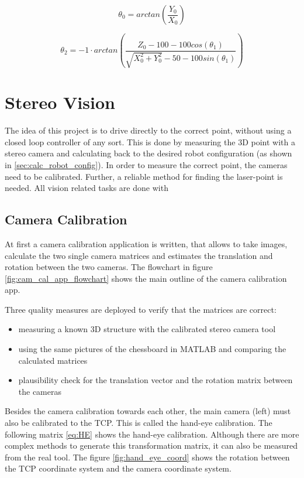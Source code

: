 \documentclass[./\jobname.tex]{subfiles}
\begin{document}
\begin{equation}
\label{eq:theta_0}
\theta_0 = arctan \left( \frac{Y_0}{X_0} \right) 
\end{equation}

\begin{equation}
\label{eq:theta_2}
\theta_2 = -1 \cdot arctan \left( \frac{ Z_0 - 100 - 100 cos(\theta_1)}{\sqrt{X_{0}^{2} + Y_{0}^{2}} - 50 - 100 sin(\theta_1)} \right)
\end{equation}

\chapter{Stereo Vision}

The idea of this project is to drive directly to the correct point, without using a closed loop controller of any sort. This is done by measuring the 3D point with a stereo camera and calculating back to the desired robot configuration (as shown in \ref{sec:calc_robot_config}). In order to measure the correct point, the cameras need to be calibrated. Further, a reliable method for finding the laser-point is needed. All vision related tasks are done with \cite{2014opencv}

\section{Camera Calibration}
At first a camera calibration application is written, that allows to take images, calculate the two single camera matrices and estimates the translation and rotation between the two cameras. The flowchart in figure \ref{fig:cam_cal_app_flowchart} shows the main outline of the camera calibration app. 

Three quality measures are deployed to verify that the matrices are correct: 
\begin{itemize}
	\item measuring a known 3D structure with the calibrated stereo camera tool
	\item using the same pictures of the chessboard in MATLAB and comparing the calculated matrices
	\item plausibility check for the translation vector and the rotation matrix between the cameras
\end{itemize}

Besides the camera calibration towards each other, the main camera (left) must also be calibrated to the TCP. This is called the hand-eye calibration. The following matrix \ref{eq:HE} shows the hand-eye calibration. Although there are more complex methods to generate this transformation matrix, it can also be measured from the real tool. The figure \ref{fig:hand_eye_coord} shows the rotation between the TCP coordinate system and the camera coordinate system.
\end{document}
